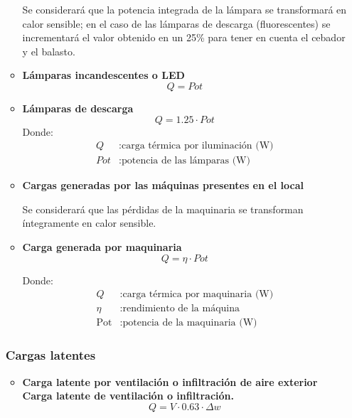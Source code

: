 \begin{itemize}
\begin{itemize}
	Se considerará que la potencia integrada de la lámpara se transformará en calor sensible; en el caso de las lámparas de descarga (fluorescentes) se incrementará el valor obtenido en un 25\% para tener en cuenta el cebador y el balasto.	
	\item \textbf{Lámparas incandescentes o LED} 
	\begin{equation} \label{eq:carga_iluminacion_incandescente}
		Q =  {Pot}
	\end{equation}	
	\item \textbf{Lámparas de descarga} 
	\begin{equation} \label{eq:carga_iluminacion_descarga}
		Q = 1{.}25 \cdot {Pot}
	\end{equation}	
	 {Donde:}
	\begin{align*}
		Q & : \text{carga térmica por iluminación (W)} \\
		 {Pot} & : \text{potencia de las lámparas (W)}
	\end{align*}
	\item \textbf{Cargas generadas por las máquinas presentes en el local}
	
	Se considerará que las pérdidas de la maquinaria se transforman íntegramente en calor sensible.	
\item \textbf{Carga generada por maquinaria} 
	\begin{equation} \label{eq:carga_maquinaria}
		Q = \eta \cdot {Pot}
	\end{equation}
	
	 {Donde:}
	\begin{align*}
		Q & : \text{carga térmica por maquinaria (W)} \\
		\eta & : \text{rendimiento de la máquina} \\
		\text{Pot} & : \text{potencia de la maquinaria (W)}
	\end{align*}
\end{itemize}
\subsubsection{Cargas latentes}
\begin{itemize}
	
	\item \textbf{Carga latente por ventilación o infiltración de aire exterior}
	\textbf{Carga latente de ventilación o infiltración.}
	\begin{equation} \label{eq:carga_latente_ventilacion}
		Q = V \cdot 0.63 \cdot \Delta w
	\end{equation}
	

\end{itemize}
\end{itemize}
